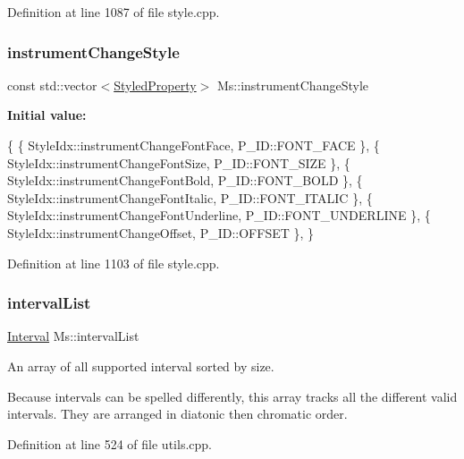 Definition at line 1087 of file style.\+cpp.

\mbox{\label{namespace_ms_a96d0a284cb9400500f90c7475db778de}} 
\subsubsection{\texorpdfstring{instrument\+Change\+Style}{instrumentChangeStyle}}
{\footnotesize\ttfamily const std\+::vector$<$\hyperlink{struct_ms_1_1_styled_property}{Styled\+Property}$>$ Ms\+::instrument\+Change\+Style}

{\bfseries Initial value\+:}
\begin{DoxyCode}
\{
      \{ StyleIdx::instrumentChangeFontFace,           P\_ID::FONT\_FACE              \},
      \{ StyleIdx::instrumentChangeFontSize,           P\_ID::FONT\_SIZE              \},
      \{ StyleIdx::instrumentChangeFontBold,           P\_ID::FONT\_BOLD              \},
      \{ StyleIdx::instrumentChangeFontItalic,         P\_ID::FONT\_ITALIC            \},
      \{ StyleIdx::instrumentChangeFontUnderline,      P\_ID::FONT\_UNDERLINE         \},
      \{ StyleIdx::instrumentChangeOffset,             P\_ID::OFFSET                 \},
      \}
\end{DoxyCode}


Definition at line 1103 of file style.\+cpp.

\mbox{\label{namespace_ms_a2619f810ea1ef33b38bc051c5b723ae0}} 
\subsubsection{\texorpdfstring{interval\+List}{intervalList}}
{\footnotesize\ttfamily \hyperlink{struct_ms_1_1_interval}{Interval} Ms\+::interval\+List}

An array of all supported interval sorted by size.

Because intervals can be spelled differently, this array tracks all the different valid intervals. They are arranged in diatonic then chromatic order. 

Definition at line 524 of file utils.\+cpp.

\mbox{\label{namespace_ms_a7828c11420b302e35348747951287cec}} 
